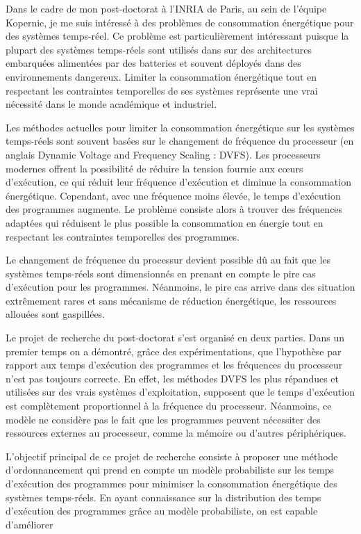 \documentclass{article}
\begin{document}
Dans le cadre de mon post-doctorat à l'INRIA de Paris, au sein de l'équipe Kopernic, je me suis intéressé à 
des problèmes de consommation énergétique pour des systèmes temps-réel. Ce problème 
est particulièrement intéressant puisque la plupart des systèmes temps-réels sont utilisés dans sur des 
architectures embarquées alimentées par des batteries et souvent déployés dans des environnements 
dangereux. Limiter la consommation énergétique tout en respectant les contraintes temporelles de ses 
systèmes représente une vrai nécessité dans le monde 
académique et industriel.

Les méthodes actuelles pour limiter la consommation énergétique sur les systèmes temps-réels sont 
souvent basées sur le changement de fréquence du processeur (en anglais Dynamic Voltage and Frequency 
Scaling : DVFS). Les processeurs modernes offrent la 
possibilité de réduire la tension fournie aux c\oe{}urs d'exécution, ce qui réduit leur fréquence d'exécution et 
diminue la consommation énergétique. Cependant, avec une fréquence moins élevée, le temps d'exécution  
des programmes augmente. Le problème consiste alors à trouver des fréquences adaptées qui réduisent le 
plus possible  la consommation en énergie tout en respectant les contraintes temporelles des programmes.


Le changement de fréquence du processur devient possible dû au fait que les systèmes temps-réels sont 
dimensionnés en prenant en compte le pire cas d'exécution pour les programmes. Néanmoins, le pire cas 
arrive dans des situation extrêmement rares et sans mécanisme de réduction énergétique, les ressources 
allouées sont gaspillées.
\vspace{.5cm}


Le projet de recherche du post-doctorat s'est organisé en deux parties. Dans un premier temps on a 
démontré, grâce des expérimentations, que l'hypothèse par rapport aux temps d'exécution des programmes 
et les fréquences du processeur n'est pas toujours correcte. En effet, les méthodes DVFS les plus répandues 
et utilisées sur des vrais systèmes d'exploitation, supposent que le temps d'exécution est complètement 
proportionnel à la fréquence du processeur. Néanmoins, ce modèle ne considère pas le fait que les 
programmes peuvent nécessiter des ressources externes au processeur, comme la mémoire ou d'autres 
périphériques.

L'objectif principal de ce projet de recherche consiste à proposer une méthode d'ordonnancement qui prend 
en compte un modèle probabiliste sur les temps d'exécution des programmes pour minimiser la 
consommation énergétique des systèmes temps-réels. En ayant connaissance sur la distribution des temps 
d'exécution des programmes grâce au modèle probabiliste, on est capable d'améliorer 
\end{document}
